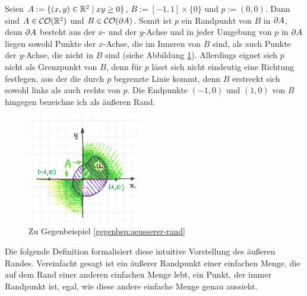     \begin{gegenbsp}\label{gegenbsp:aeusserer-rand}
        Seien $A := \{(x,y) \in \mathbb{R}^2 \mid xy \geq 0\}$, $B := [-1,1] \times \{0\}$ und $p := (0,0)$. 
        Dann sind $A \in \mathcal{CO}(\mathbb{R}^2)$ und $B \in \mathcal{CO}(\partial A)$.
        Somit ist $p$ ein Randpunkt von $B$ in $\partial A$, denn $\partial A$ besteht aus der $x$- und der $y$-Achse und in jeder Umgebung von $p$ in $\partial A$ liegen sowohl Punkte der $x$-Achse, die im Inneren von $B$ sind, als auch Punkte der $y$-Achse, die nicht in $B$ sind (siehe Abbildung \ref{fig:kein-aeusserer-rand}).
        Allerdings eignet sich $p$ nicht als Grenzpunkt von $B$, denn für $p$ lässt sich nicht eindeutig eine Richtung festlegen, \glqq aus der die durch $p$ begrenzte Linie kommt\grqq, denn $B$ erstreckt sich sowohl links als auch rechts von $p$.
        Die Endpunkte $(-1,0)$ und $(1,0)$ von $B$ hingegen bezeichne ich als äußeren Rand.
    \end{gegenbsp}
    
    \begin{figure}[ht]
        \centering
        \includegraphics[width=5cm]{bearbeitet-22-04-25/kein-aeusserer-rand.png}
        \caption{Zu Gegenbeispiel \ref{gegenbsp:aeusserer-rand}}
        \label{fig:kein-aeusserer-rand}
    \end{figure}

    Die
    folgende Definition formalisiert diese intuitive Vorstellung des äußeren Randes.
    Vereinfacht gesagt ist ein äußerer Randpunkt einer einfachen Menge, die auf dem Rand einer anderen einfachen Menge \glqq lebt\grqq, ein Punkt, der immer Randpunkt ist, egal, wie diese andere einfache Menge genau aussieht.

